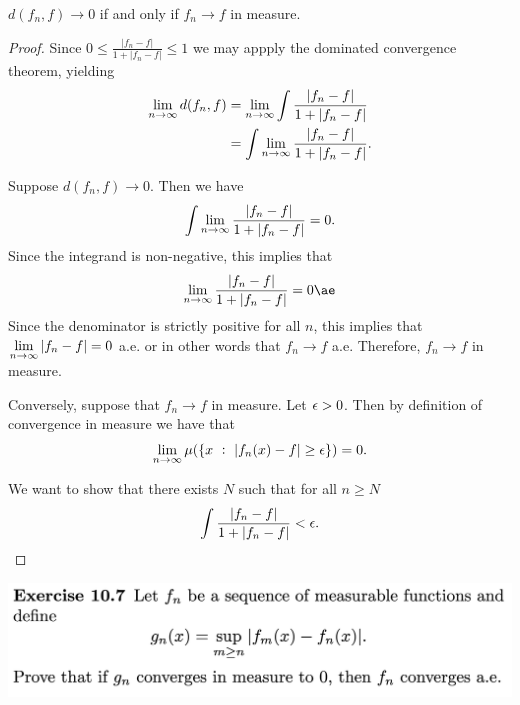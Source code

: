 \begin{claim*}
  $d(f_n, f) \to 0$ if and only if $f_n \to f$ in measure.
\end{claim*}

\begin{proof}
  Since $0 \leq \frac{|f_n - f|}{1 + |f_n - f|} \leq 1$ we may appply the dominated convergence theorem,
  yielding
  \begin{align*}
    \limn d(f_n, f)
    &= \limn \int \frac{|f_n - f|}{1 + |f_n - f|} \\
    &= \int \limn \frac{|f_n - f|}{1 + |f_n - f|}.
  \end{align*}

  Suppose $d(f_n, f) \to 0$. Then we have
  \begin{align*}
    \int \limn \frac{|f_n - f|}{1 + |f_n - f|} = 0.
  \end{align*}
  Since the integrand is non-negative, this implies that
  \begin{align*}
    \limn \frac{|f_n - f|}{1 + |f_n - f|} = 0 \ae
  \end{align*}
  Since the denominator is strictly positive for all $n$, this implies that $\limn |f_n - f| = 0$ a.e. or in
  other words that $f_n \to f$ a.e. Therefore, $f_n \to f$ in measure.

  Conversely, suppose that $f_n \to f$ in measure. Let $\epsilon > 0$. Then by definition of convergence in measure
  we have that
  \begin{align*}
    \limn \mu(\{x ~:~ |f_n(x) - f| \geq \eps\}) = 0.
  \end{align*}


  We want to show that there exists $N$ such that for all $n \geq N$
  \begin{align*}
    \int \frac{|f_n - f|}{1 + |f_n - f|} < \epsilon.
  \end{align*}
\end{proof}


\newpage
\begin{mdframed}
\includegraphics[width=400pt]{img/analysis--berkeley-202a-hw09-ea17.png}
\end{mdframed}